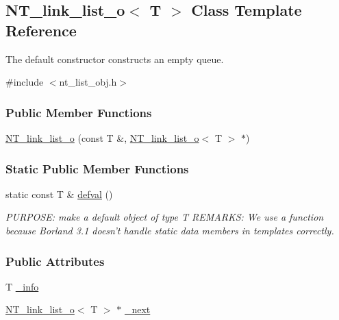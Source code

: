 \subsection{NT\_\-link\_\-list\_\-o$<$ T $>$ Class Template Reference}
\label{class_n_t__link__list__o}


The default constructor constructs an empty queue.  




{\ttfamily \#include $<$nt\_\-list\_\-obj.h$>$}

\subsubsection*{Public Member Functions}
\begin{DoxyCompactItemize}
\item 
\hyperlink{class_n_t__link__list__o_a3a3dcf35f553ec84095fb50b1593b679}{NT\_\-link\_\-list\_\-o} (const T \&, \hyperlink{class_n_t__link__list__o}{NT\_\-link\_\-list\_\-o}$<$ T $>$ $\ast$)
\end{DoxyCompactItemize}
\subsubsection*{Static Public Member Functions}
\begin{DoxyCompactItemize}
\item 
static const T \& \hyperlink{class_n_t__link__list__o_a0f2207ffc849925dd3929f90f8f32dbb}{defval} ()
\begin{DoxyCompactList}\small\item\em PURPOSE: make a default object of type T REMARKS: We use a function because Borland 3.1 doesn't handle static data members in templates correctly. \item\end{DoxyCompactList}\end{DoxyCompactItemize}
\subsubsection*{Public Attributes}
\begin{DoxyCompactItemize}
\item 
T \hyperlink{class_n_t__link__list__o_a1a04d05e12144ee828d792a3ab845e38}{\_\-info}
\item 
\hyperlink{class_n_t__link__list__o}{NT\_\-link\_\-list\_\-o}$<$ T $>$ $\ast$ \hyperlink{class_n_t__link__list__o_aa041aa15bea3e4daa817eb99f8017760}{\_\-next}
\end{DoxyCompactItemize}


